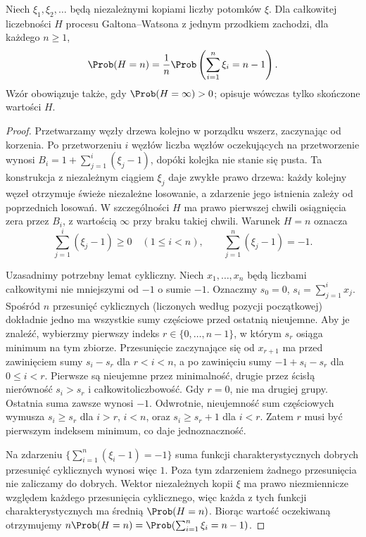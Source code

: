 \begin{twierdzenie}
\label{thm:gw-dwass}
Niech $\xi_1,\xi_2,\ldots$ będą niezależnymi kopiami
liczby potomków $\xi$. Dla całkowitej liczebności
$H$ procesu Galtona--Watsona z jednym przodkiem
zachodzi, dla każdego $n\ge1$,
\[
\Prob(H=n)=\frac1n
\Prob\left(\sum_{i=1}^n\xi_i=n-1\right).
\]
Wzór obowiązuje także, gdy $\Prob(H=\infty)>0$;
opisuje wówczas tylko skończone wartości $H$.
\end{twierdzenie}
\begin{proof}
Przetwarzamy węzły drzewa kolejno w porządku
wszerz, zaczynając od korzenia. Po przetworzeniu
$i$ węzłów liczba węzłów oczekujących na
przetworzenie wynosi
$B_i=1+\sum_{j=1}^i(\xi_j-1)$,
dopóki kolejka nie stanie się pusta.
Ta konstrukcja z niezależnym ciągiem $\xi_j$
daje zwykłe prawo drzewa: każdy kolejny węzeł
otrzymuje świeże niezależne losowanie, a zdarzenie
jego istnienia zależy od poprzednich losowań.
W szczególności $H$ ma prawo pierwszej chwili
osiągnięcia zera przez $B_i$, z wartością
$\infty$ przy braku takiej chwili.
Warunek $H=n$ oznacza
\[
\sum_{j=1}^i(\xi_j-1)\ge0\quad(1\le i<n),
\qquad \sum_{j=1}^n(\xi_j-1)=-1.
\]

Uzasadnimy potrzebny lemat cykliczny.
Niech $x_1,\ldots,x_n$ będą liczbami całkowitymi
nie mniejszymi od $-1$ o sumie $-1$.
Oznaczmy $s_0=0$, $s_i=\sum_{j=1}^i x_j$.
Spośród $n$ przesunięć cyklicznych (liczonych
według pozycji początkowej) dokładnie jedno
ma wszystkie sumy częściowe przed ostatnią
nieujemne. Aby je znaleźć, wybierzmy pierwszy
indeks $r\in\{0,\ldots,n-1\}$, w którym
$s_r$ osiąga minimum na tym zbiorze.
Przesunięcie zaczynające się od $x_{r+1}$
ma przed zawinięciem sumy $s_i-s_r$ dla $r<i<n$,
a po zawinięciu sumy $-1+s_i-s_r$ dla $0\le i<r$.
Pierwsze są nieujemne przez minimalność,
drugie przez ścisłą nierówność $s_i>s_r$
i całkowitoliczbowość. Gdy $r=0$, nie ma
drugiej grupy. Ostatnia suma zawsze wynosi $-1$.
Odwrotnie, nieujemność sum częściowych wymusza
$s_i\ge s_r$ dla $i>r$, $i<n$, oraz
$s_i\ge s_r+1$ dla $i<r$. Zatem $r$ musi być
pierwszym indeksem minimum, co daje jednoznaczność.

Na zdarzeniu $\{\sum_{i=1}^n(\xi_i-1)=-1\}$
suma funkcji charakterystycznych dobrych
przesunięć cyklicznych wynosi więc $1$.
Poza tym zdarzeniem żadnego przesunięcia
nie zaliczamy do dobrych. Wektor niezależnych
kopii $\xi$ ma prawo niezmiennicze względem
każdego przesunięcia cyklicznego, więc każda
z tych funkcji charakterystycznych ma średnią
$\Prob(H=n)$. Biorąc wartość oczekiwaną
otrzymujemy $n\Prob(H=n)=
\Prob(\sum_{i=1}^n\xi_i=n-1)$.
\end{proof}

